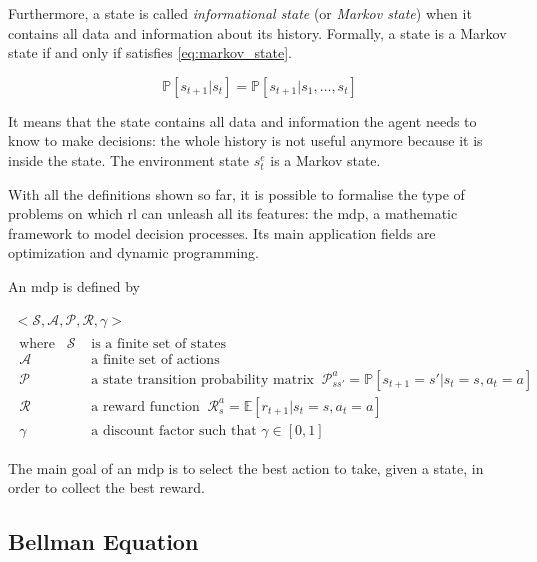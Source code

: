 Furthermore, a state is called \textit{informational state} (or \textit{Markov state}) when it contains all data and information about its history. Formally, a state is a Markov state if and only if satisfies \vref{eq:markov_state}.

\begin{equation} \label{eq:markov_state}
	\mathbb{P}[s_{t+1}| s_t] = \mathbb{P}[s_{t+1} | s_1, \dots, s_t]
\end{equation}

 It means that the state contains all data and information the agent needs to know to make decisions: the whole history is not useful anymore because it is inside the state. The environment state $s_t^e$ is a Markov state.
 
 With all the definitions shown so far, it is possible to formalise the type of problems on which \acrshort{rl} can unleash all its features: the \acrfull{mdp}, a mathematic framework to model decision processes. Its main application fields are optimization and dynamic programming.
 
 An \acrshort{mdp} is defined by 

 \begin{equation}\label{eq:mdp}
 \begin{gathered} 
 <\mathcal{S}, \mathcal{A}, \mathcal{P}, \mathcal{R}, \gamma>\\
 \begin{aligned}
 	\text{where}\hspace{10pt} \mathcal{S} & \text{ is a finite set of states} \\
 	\mathcal{A} & \text{ a finite set of actions} \\
 	\mathcal{P} & \text{ a state transition probability matrix}\;\;
 	 \mathcal{P}_{ss'}^a = \mathbb{P}[s_{t+1}= s' | s_t = s, a_t = a]\\
 	\mathcal{R} & \text{ a reward function}
 	 	\;\; \mathcal{R}_{s}^a = \mathbb{E}[r_{t+1} | s_t = s, a_t = a] \\
 	 \gamma & \text{ a discount factor such that } \gamma \in [0,1]
 \end{aligned}
 \end{gathered}
 \end{equation}


The main goal of an \acrshort{mdp} is to select the best action to take, given a state, in order to collect the best reward. 

\subsection{Bellman Equation}

